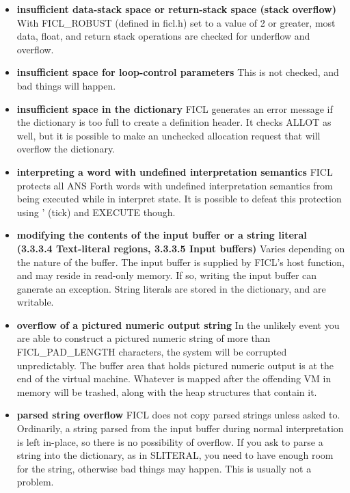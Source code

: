 \begin{itemize}[noitemsep]
	\item \textbf{insufficient data-stack space or return-stack
		space (stack overflow)}\newline
	With FICL\_ROBUST (defined in ficl.h) set to a value of 2 or
	greater, most data, float, and return stack operations are
	checked for underflow and overflow.

	\item \textbf{insufficient space for loop-control
		parameters}\newline
	This is not checked, and bad things will happen.

	\item \textbf{insufficient space in the dictionary}\newline
		FICL generates an error message if the dictionary is
		too full to create a definition header. It checks ALLOT
		as well, but it is possible to make an unchecked
		allocation request that will overflow the dictionary.

	\item \textbf{interpreting a word with undefined interpretation
		semantics}\newline
	FICL protects all ANS Forth words with undefined interpretation
	semantics from being executed while in interpret state. It is
	possible to defeat this protection using ' (tick) and EXECUTE
	though.

	\item \textbf{modifying the contents of the input buffer or a
		string literal (3.3.3.4 Text-literal regions, 3.3.3.5
		Input buffers)}\newline
	Varies depending on the nature of the buffer. The input buffer
	is supplied by FICL's host function, and may reside in read-only
	memory. If so, writing the input buffer can ganerate an
	exception. String literals are stored in the dictionary, and are
	writable.

	\item \textbf{overflow of a pictured numeric output
		string}\newline
	In the unlikely event you are able to construct a pictured
	numeric string of more than FICL\_PAD\_LENGTH characters, the
	system will be corrupted unpredictably. The buffer area that
	holds pictured numeric output is at the end of the virtual
	machine. Whatever is mapped after the offending VM in memory
	will be trashed, along with the heap structures that contain it.

	\item \textbf{parsed string overflow}\newline
		FICL does not copy parsed strings unless asked to.
		Ordinarily, a string parsed from the input buffer during
		normal interpretation is left in-place, so there is no
		possibility of overflow. If you ask to parse a string
		into the dictionary, as in SLITERAL, you need to have
		enough room for the string, otherwise bad things may
		happen. This is usually not a problem.


\end{itemize}

